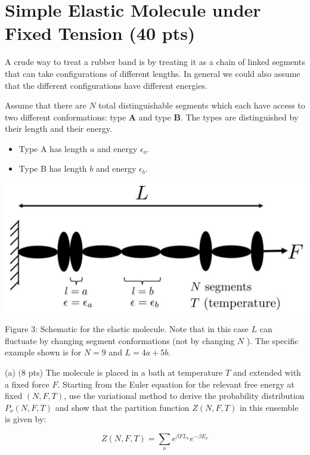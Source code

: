 \documentclass[12pt]{article}
\begin{document}
\section{Simple Elastic Molecule under Fixed Tension (40 pts)}
A crude way to treat a rubber band is by treating it as a chain of linked segments that can take configurations of different lengths. In general we could also assume that the different configurations have different energies.

Assume that there are $N$ total distinguishable segments which each have access to two different conformations: type $\mathbf{A}$ and type $\mathbf{B}$. The types are distinguished by their length and their energy.

\begin{itemize}
  \item Type A has length $a$ and energy $\epsilon_{a}$.
  \item Type B has length $b$ and energy $\epsilon_{b}$.
\end{itemize}

\begin{center}
\includegraphics[max width=\textwidth]{2024_02_03_75704bce2caff28cbfb1g-5}
\end{center}

Figure 3: Schematic for the elastic molecule. Note that in this case $L$ can fluctuate by changing segment conformations (not by changing $N$ ). The specific example shown is for $N=9$ and $L=4 a+5 b$.

(a) $(8$ pts) The molecule is placed in a bath at temperature $T$ and extended with a fixed force $F$. Starting from the Euler equation for the relevant free energy at fixed $(N, F, T)$, use the variational method to derive the probability distribution $P_{\nu}(N, F, T)$ and show that the partition function $Z(N, F, T)$ in this ensemble is given by:

$$
Z(N, F, T)=\sum_{\nu} e^{\beta F L_{\nu}} e^{-\beta E_{\nu}}
$$
\end{document}
